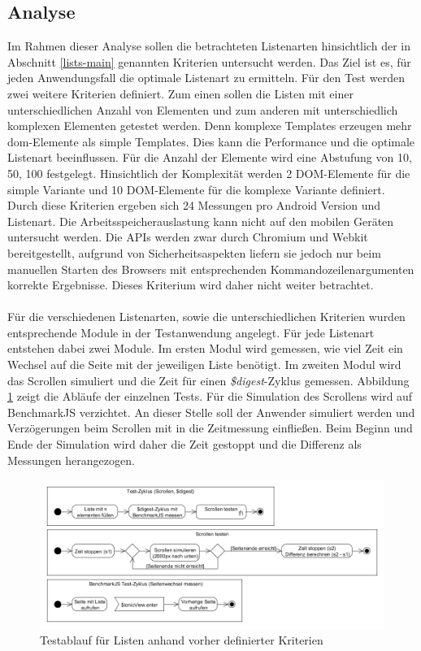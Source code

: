 \subsection{Analyse}
Im Rahmen dieser Analyse sollen die betrachteten Listenarten hinsichtlich der in Abschnitt \ref{lists-main} genannten Kriterien untersucht werden. Das Ziel ist es, für jeden Anwendungsfall die optimale Listenart zu ermitteln. Für den Test werden zwei weitere Kriterien definiert. Zum einen sollen die Listen mit einer unterschiedlichen Anzahl von Elementen und zum anderen mit unterschiedlich komplexen Elementen getestet werden. Denn komplexe \glspl{Template} erzeugen mehr \gls{dom}-Elemente als simple \glspl{Template}. Dies kann die Performance und die optimale Listenart beeinflussen. Für die Anzahl der Elemente wird eine Abstufung von 10, 50, 100 festgelegt. Hinsichtlich der Komplexität werden 2 DOM-Elemente für die simple Variante und 10 DOM-Elemente für die komplexe Variante definiert. Durch diese Kriterien ergeben sich 24 Messungen pro Android Version und Listenart. Die Arbeitsspeicherauslastung kann nicht auf den mobilen Geräten untersucht werden. Die APIs werden zwar durch Chromium und Webkit bereitgestellt, aufgrund von Sicherheitsaspekten liefern sie jedoch nur beim manuellen Starten des Browsers mit entsprechenden Kommandozeilenargumenten korrekte Ergebnisse. Dieses Kriterium wird daher nicht weiter betrachtet. 
\\\\
Für die verschiedenen Listenarten, sowie die unterschiedlichen Kriterien wurden entsprechende Module in der Testanwendung angelegt. Für jede Listenart entstehen dabei zwei Module. Im ersten Modul wird gemessen, wie viel Zeit ein Wechsel auf die Seite mit der jeweiligen Liste benötigt. Im zweiten Modul wird das Scrollen simuliert und die Zeit für einen \emph{\$digest}-Zyklus gemessen. Abbildung \ref{lists-test-prozess} zeigt die Abläufe der einzelnen Tests. Für die Simulation des Scrollens wird auf BenchmarkJS verzichtet. An dieser Stelle soll der Anwender simuliert werden und Verzögerungen beim Scrollen mit in die Zeitmessung einfließen. Beim Beginn und Ende der Simulation wird daher die Zeit gestoppt und die Differenz als Messungen herangezogen.  
\begin{figure}[h]
	\centering
	\includegraphics[scale=0.4]{Bilder/UML-Activity-Listen.png}
	\caption{Testablauf für Listen anhand vorher definierter Kriterien}
	\label{lists-test-prozess}
\end{figure}

